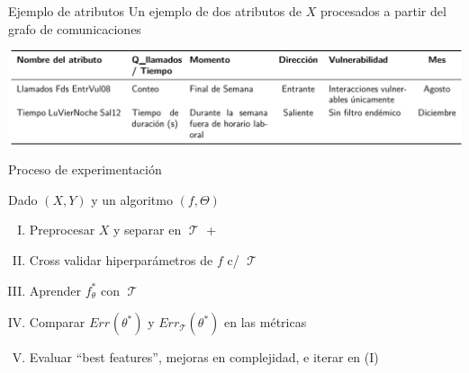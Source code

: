 \documentclass[xcolor=x11names]{beamer}
\DeclareMathOperator{\trainset}{\mathcal{T}}
\DeclareMathOperator{\testset}{\mathcal{T_s}}
\begin{document}
\begin{frame}{Ejemplo de atributos}
Un ejemplo de dos atributos de $X$ procesados a partir del grafo de comunicaciones
  \begin{center}
    \includegraphics[scale=0.7]{slides/tabla_atributos.pdf}
  \end{center}
\end{frame}




\begin{frame}{ Proceso de experimentación }

Dado $(X,Y)$ y un algoritmo $\left( f, \Theta \right)  $
	\begin{enumerate}[I.]
		\item Preprocesar $X$ y separar en $\trainset$ + $\testset$
		\item Cross validar hiperparámetros de $f$ c/ $\trainset$
		\item Aprender $f_\theta^*$ con $\trainset$
		\item Comparar  $Err_{\testset}(\theta^*)$ y  $Err_{\trainset}(\theta^*)$ en las métricas
		\item Evaluar ``best features'', mejoras en complejidad, e iterar en (I)
	\end{enumerate}

\end{frame}
\end{document}
